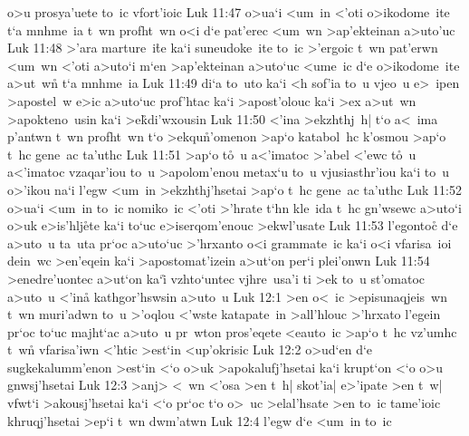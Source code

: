 o>u
prosya'uete
to~ic
vfort'ioic\bibvsend
\vs Luk 11:47
o>ua`i
<um~in
<'oti
o>ikodome~ite
t`a
mnhme~ia
t~wn
profht~wn
o<i
d`e
pat'erec
<um~wn
>ap'ekteinan
a>uto'uc\bibvsend
\vs Luk 11:48
>'ara
marture~i\r{t}e
ka`i
suneudoke~ite
to~ic
>'ergoic
t~wn
pat'erwn
<um~wn
<'oti
a>uto`i
m`en
>ap'ekteinan
a>uto`uc
<ume~ic
d`e
o>ikodome~ite
a>ut~wn\r{}
t`a
mnhme~ia\bibvsend
\vs Luk 11:49
di`a
to~uto
ka`i
<h
sof'ia
to~u
vjeo~u
e>~ipen
>apostel~w
e>ic
a>uto`uc
prof'htac
ka`i
>apost'olouc
ka`i
>ex
a>ut~wn
>apokteno~usin
ka`i
>e\r{k}di'wxousin\bibvsend
{}
\vs Luk 11:50
<'ina
>ekzhthj~h|
t`o
a<~ima
p'antwn
t~wn
profht~wn
t`o
>ekqu\r{n}'omenon
>ap`o
katabol~hc
k'osmou
>ap`o
t~hc
gene~ac
ta'uthc\bibvsend
\vs Luk 11:51
>ap`o
t\r{o}~u
a<'imatoc
>'abel
<'ewc
t\r{o}~u
a<'imatoc
vzaqar'iou
to~u
>apolom'enou
metax`u
to~u
vjusiasthr'iou
ka`i
to~u
o>'ikou
na`i
l'egw
<um~in
>ekzhthj'hsetai
>ap`o
t~hc
gene~ac
ta'uthc\bibvsend
\vs Luk 11:52
o>ua`i
<um~in
to~ic
nomiko~ic
<'oti
>'hrate
t`hn
kle~ida
t~hc
gn'wsewc
a>uto`i
o>uk
e>is'hlj\r{e}te
ka`i
to`uc
e>iserqom'enouc
>ekwl'usate\bibvsend
\vs Luk 11:53
l'egontoc\r{}
d`e
a>uto~u
ta~uta
pr`oc
a>uto`uc
>'hrxanto
o<i
grammate~ic
ka`i
o<i
vfarisa~ioi
dein~wc
>en'eqein
ka`i
>apostomat'izein
a>ut`on
per`i
plei'onwn\bibvsend
\vs Luk 11:54
>enedre'uontec
a>ut`on
ka`i\r{}
vzhto`untec
vjhre~usa'i
ti
>ek
to~u
st'omatoc
a>uto~u
<'ina\r{}
kathgor'hswsin
a>uto~u\bibvsend
\vs Luk 12:1
>en
o<~ic
>episunaqjeis~wn
t~wn
muri'adwn
to~u
>'oqlou
<'wste
katapate~in
>all'hlouc
>'hrxato
l'egein
pr`oc
to`uc
majht`ac
a>uto~u
pr~wton
pros'eqete
<eauto~ic
>ap`o
t~hc
vz'umhc
t~wn\r{}
vfarisa'iwn
<'htic
>est`in
<up'okrisic\bibvsend
\vs Luk 12:2
o>ud`en
d`e
sugkekalumm'enon
>est`in
<`o
o>uk
>apokalufj'hsetai
ka`i
krupt`on
<`o
o>u
gnwsj'hsetai\bibvsend
\vs Luk 12:3
>anj>
<~wn
<'osa
>en
t~h|
skot'ia|
e>'ipate
>en
t~w|
vfwt`i
>akousj'hsetai
ka`i
<`o
pr`oc
t`o
o>~uc
>elal'hsate
>en
to~ic
tame'ioic
khruqj'hsetai
>ep`i
t~wn
dwm'atwn\bibvsend
\vs Luk 12:4
l'egw
d`e
<um~in
to~ic
